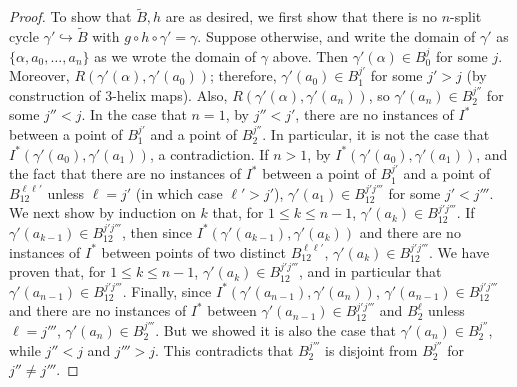\documentclass{amsart}
\theoremstyle{definition}
\theoremstyle{remark}
\numberwithin{equation}{section}
\begin{document}
\begin{proof}
 To show that $\tilde{B}, h$ are as desired, we first show that there is no $n$-split cycle $\gamma' \hookrightarrow \tilde{B} $ with $g \circ h \circ \gamma' = \gamma$.  Suppose otherwise, and write the domain of $\gamma'$ as  $\{\alpha, a_0, \ldots, a_{n}\}$ as we wrote the domain of $\gamma$ above. Then $\gamma'(\alpha) \in B^{j}_{0}$ for some $j$. Moreover, $R(\gamma'(\alpha), \gamma'(a_{0}))$; therefore, $\gamma'(a_0) \in B^{j'}_{1} $ for some $j' > j$ (by construction of $3$-helix maps). Also, $R(\gamma'(\alpha), \gamma'(a_{n}))$, so $\gamma'(a_n) \in B^{j''}_{2} $ for some $j'' < j$.  In the case that $n=1$, by $j'' < j'$, there are no instances of $I^{*}$ between a point of $B^{j'}_{1}$ and a point of $B^{j''}_{2}$. In particular, it is not the case that $I^{*}(\gamma'(a_{0}), \gamma'(a_{1}))$, a contradiction. If $n > 1$, by $I^{*}(\gamma'(a_0), \gamma'(a_1))$, and the fact that there are no instances of $I^{*}$ between a point of $B^{j'}_{1}$ and a point of $B_{12}^{\ell\ell'}$ unless $\ell=j'$ (in which case $\ell' > j'$), $\gamma'(a_1) \in B^{j'j'''}_{12}$ for some $j'<j'''$.  We next show by induction on $k$ that, for $ 1 \leq k \leq n-1$, $\gamma'(a_k) \in B^{j'j'''}_{12}$. If $\gamma'(a_{k-1}) \in B^{j'j'''}_{12}$, then since $I^{*}(\gamma'(a_{k-1}), \gamma'(a_k))$ and there are no instances of $I^{*}$ between points of two distinct $B^{\ell\ell'}_{12}$, $\gamma'(a_k) \in B^{j'j'''}_{12}$.  We have proven that, for $ 1 \leq k \leq n-1$, $\gamma'(a_k) \in B^{j'j'''}_{12}$, and in particular that  $\gamma'(a_{n-1}) \in B^{j'j'''}_{12}$. Finally, since $I^{*}(\gamma'(a_{n-1}), \gamma'(a_n))$, $\gamma'(a_{n-1}) \in B^{j'j'''}_{12}$ and there are no instances of $I^{*}$ between $\gamma'(a_{n-1}) \in B^{j'j'''}_{12}$ and $B_{2}^{\ell}$ unless $\ell=j'''$, $\gamma'(a_n) \in B^{j'''}_{2} $. But we showed it is also the case that $\gamma'(a_n) \in B^{j''}_{2} $, while $j'' < j$ and $j''' > j$. This contradicts that $B^{j'''}_{2}$ is disjoint from $B^{j''}_{2}$ for $j'' \neq j'''$.



\end{proof}
\end{document}
